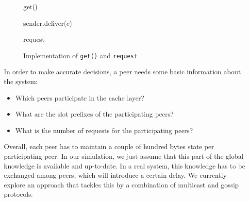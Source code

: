\begin{figure}[htbp]
	\centering
	\begin{algorithm2e}[H]
				\caption{get()}
				\label{alg:get}
			\end{algorithm2e}
	
	\begin{algorithm2e}[H]
				 
				sender.deliver($c$)
				\caption{request}
				\label{alg:request}
			\end{algorithm2e}
	\caption{Implementation of \texttt{get()} and \texttt{request}}
	\label{lst:impl}
\end{figure}	

\bigskip

In order to make accurate decisions, a peer needs some basic information about the system:
\begin{itemize}
	\item Which peers participate in the cache layer?
	\item What are the slot prefixes of the participating peers?
	\item What is the number of requests for the participating peers?
\end{itemize}

Overall, each peer has to maintain a couple of hundred bytes state per participating peer.
In our simulation, we just assume that this part of the global knowledge is available and up-to-date.
In a real system, this knowledge has to be exchanged among peers, which will introduce a certain delay.
We currently explore an approach that tackles this by a combination of multicast and gossip protocols.

